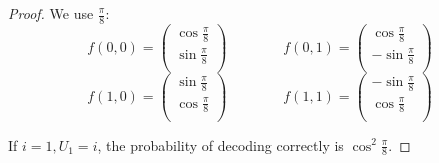 \documentclass{article}
\begin{document}
\begin{proof}
We use $\frac{\pi}{8}$:
\[f(0,0)=\begin{pmatrix}
\cos\frac{\pi}{8}\\
\sin\frac{\pi}{8}\\
\end{pmatrix}
\qquad \qquad 
f(0,1)=\begin{pmatrix}
\cos\frac{\pi}{8}\\
- \sin \frac{\pi}{8}\\
\end{pmatrix}\]
\[f(1,0)=\begin{pmatrix}
\sin\frac{\pi}{8}\\
\cos\frac{\pi}{8}\\
\end{pmatrix}
\qquad \qquad
f(1,1)=\begin{pmatrix}
- \sin \frac{\pi}{8}\\
\cos\frac{\pi}{8}\\
\end{pmatrix}\]

If $i=1,U_1=i$, the probability of decoding correctly is $\cos^2 \frac{\pi}{8}$.



\end{proof}
\end{document}
